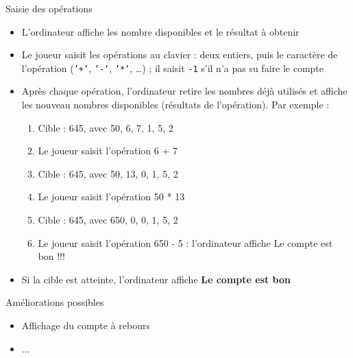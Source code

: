 \begin{UPSTICahierDesCharges}{Saisie des opérations}
\begin{itemize}
  \item L'ordinateur affiche les nombre disponibles et le résultat à obtenir
  \item Le joueur saisit les opérations au clavier : deux entiers, puis le caractère de l'opération (\texttt{'+'}, \texttt{'-'}, \texttt{'*'}, \ldots) ; il saisit \texttt{-1} s'il n'a pas su faire le compte
  \item Après chaque opération, l'ordinateur retire les nombres déjà utilisés et affiche les nouveau nombres disponibles (résultats de l'opération). Par exemple : 
  \begin{enumerate}
    \item Cible : 645, avec 50, 6, 7, 1, 5, 2
    \item Le joueur saisit l'opération 6 + 7
    \item Cible : 645, avec 50, 13, 0, 1, 5, 2
    \item Le joueur saisit l'opération 50 * 13
    \item Cible : 645, avec 650, 0, 0, 1, 5, 2
    \item Le joueur saisit l'opération 650 - 5 : l'ordinateur affiche \og Le compte est bon !!! \fg{}
  \end{enumerate}
  \item Si la cible est atteinte, l'ordinateur affiche \textbf{Le compte est bon}
\end{itemize}  
\end{UPSTICahierDesCharges}
\begin{UPSTICahierDesCharges}{Améliorations possibles}
\begin{itemize}
  \item Affichage du compte à rebours
  \item ...
\end{itemize}  

\end{UPSTICahierDesCharges}

